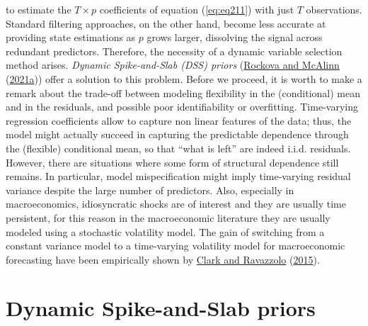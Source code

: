 \documentclass[
  12pt,
]{book}
\theoremstyle{break}
\theoremstyle{nonumberplain}
\begin{document}
to estimate the \(T\times p\) coefficients of equation (\ref{eq:eq211})
with just \(T\) observations. Standard filtering approaches, on the
other hand, become less accurate at providing state estimations as \(p\)
grows larger, dissolving the signal across redundant predictors.
Therefore, the necessity of a dynamic variable selection method arises.
\emph{Dynamic Spike-and-Slab (DSS) priors}
(\protect\hyperlink{ref-rockova_mcalinn_2021}{Rockova and McAlinn}
(\protect\hyperlink{ref-rockova_mcalinn_2021}{2021a})) offer a solution
to this problem. Before we proceed, it is worth to make a remark about
the trade-off between modeling flexibility in the (conditional) mean and
in the residuals, and possible poor identifiability or overfitting.
Time-varying regression coefficients allow to capture non linear
features of the data; thus, the model might actually succeed in
capturing the predictable dependence through the (flexible) conditional
mean, so that ``what is left'' are indeed i.i.d. residuals. However,
there are situations where some form of structural dependence still
remains. In particular, model mispecification might imply time-varying
residual variance despite the large number of predictors. Also,
especially in macroeconomics, idiosyncratic shocks are of interest and
they are usually time persistent, for this reason in the macroeconomic
literature they are usually modeled using a stochastic volatility model.
The gain of switching from a constant variance model to a time-varying
volatility model for macroeconomic forecasting have been empirically
shown by \protect\hyperlink{ref-CR_2015}{Clark and Ravazzolo}
(\protect\hyperlink{ref-CR_2015}{2015}).

\section{Dynamic Spike-and-Slab priors}
\end{document}
